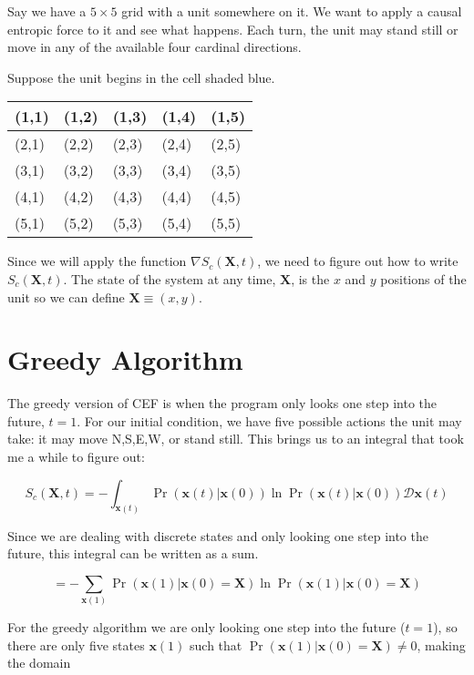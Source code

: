 \documentclass{article}
\newcommand{\tbf}[1]{\textbf{#1}}
\begin{document}
Say we have a $5\times5$ grid with a unit somewhere on it. We want to apply a causal entropic force to it and see what happens. Each turn, the unit may stand still or move in any of the available four cardinal directions.

Suppose the unit begins in the cell shaded blue.

\vspace{1em}

\noindent\begin{tabular}{|P|P|P|P|P|}
\hline
(1,1) & (1,2) & (1,3) & (1,4) & (1,5) \tabularnewline
\hline
(2,1) & (2,2) & (2,3) & (2,4) & (2,5) \tabularnewline
\hline
(3,1) & (3,2) & (3,3) & (3,4) & (3,5) \tabularnewline
\hline
(4,1) & (4,2) & (4,3) & (4,4) & (4,5) \tabularnewline
\hline
(5,1) & (5,2) & (5,3) & (5,4) & (5,5) \tabularnewline
\hline
\end{tabular}

\vspace{1em}

Since we will apply the function $\nabla S_c(\textbf{X},t)$, we need to figure out how to write $S_c(\textbf{X},t)$. The state of the system at any time, $\textbf{X}$, is the $x$ and $y$ positions of the unit so we can define $\textbf{X}\equiv (x,y)$.

\section{Greedy Algorithm}

The greedy version of CEF is when the program only looks one step into the future, $t=1$. For our initial condition, we have five possible actions the unit may take: it may move N,S,E,W, or stand still. This brings us to an integral that took me a while to figure out:

\begin{equation}
S_c(\textbf{X},t)=-\int_{\tbf x(t)} \Pr(\tbf x(t)|\tbf x(0))\ln\Pr(\tbf x(t)|\tbf x(0))\mathcal{D}\tbf x(t)
\end{equation}

Since we are dealing with discrete states and only looking one step into the future, this integral can be written as a sum.

\begin{equation}
=-\sum_{\tbf x(1)} \Pr(\tbf x(1)|\tbf x(0)=\tbf X)\ln\Pr(\tbf x(1)|\tbf x(0)=\tbf X)
\end{equation}

For the greedy algorithm we are only looking one step into the future ($t=1$), so there are only five states $\tbf x(1)$ such that $\Pr(\tbf x(1)|\tbf x(0)=\tbf X)\ne 0$, making the domain
\end{document}
